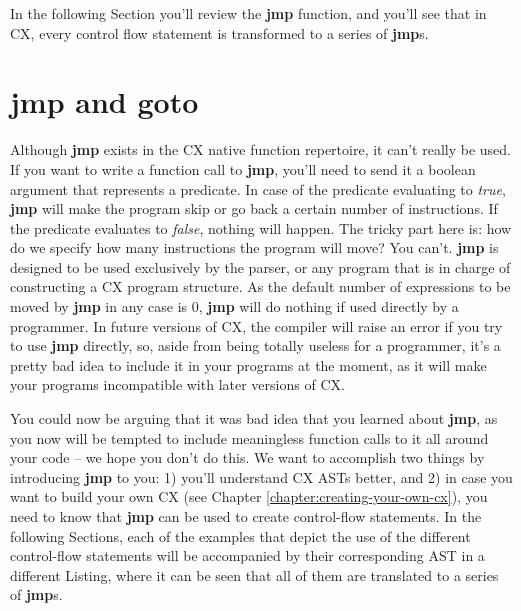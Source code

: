 \documentclass[11pt,fleqn,openany]{book} %
\begin{document}
In the following Section you'll review the \textbf{jmp} function, and you'll see that in CX, every control flow statement is transformed to a series of \textbf{jmp}s.

\section{jmp and goto}


Although \textbf{jmp} exists in the CX native function repertoire, it can't really be used. If you want to write a function call to \textbf{jmp}, you'll need to send it a boolean argument that represents a predicate. In case of the predicate evaluating to \emph{true}, \textbf{jmp} will make the program skip or go back a certain number of instructions. If the predicate evaluates to \emph{false}, nothing will happen. The tricky part here is: how do we specify how many instructions the program will move? You can't. \textbf{jmp} is designed to be used exclusively by the parser, or any program that is in charge of constructing a CX program structure. As the default number of expressions to be moved by \textbf{jmp} in any case is 0, \textbf{jmp} will do nothing if used directly by a programmer. In future versions of CX, the compiler will raise an error if you try to use \textbf{jmp} directly, so, aside from being totally useless for a programmer, it's a pretty bad idea to include it in your programs at the moment, as it will make your programs incompatible with later versions of CX.

You could now be arguing that it was bad idea that you learned about \textbf{jmp}, as you now will be tempted to include meaningless function calls to it all around your code -- we hope you don't do this. We want to accomplish two things by introducing \textbf{jmp} to you: 1) you'll understand CX ASTs better, and 2) in case you want to build your own CX (see Chapter \ref{chapter:creating-your-own-cx}), you need to know that \textbf{jmp} can be used to create control-flow statements. In the following Sections, each of the examples that depict the use of the different control-flow statements will be accompanied by their corresponding AST in a different Listing, where it can be seen that all of them are translated to a series of \textbf{jmp}s.
\end{document}
